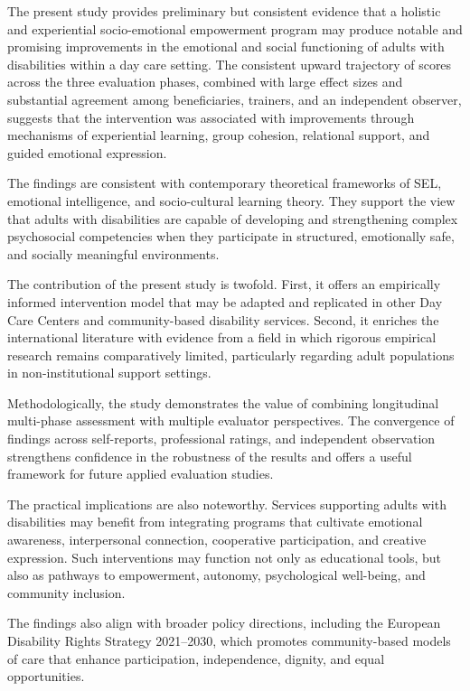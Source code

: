 \documentclass[12pt,a4paper]{article}
\begin{document}
The present study provides preliminary but consistent evidence that a holistic and experiential socio-emotional empowerment program may produce notable and promising improvements in the emotional and social functioning of adults with disabilities within a day care setting. The consistent upward trajectory of scores across the three evaluation phases, combined with large effect sizes and substantial agreement among beneficiaries, trainers, and an independent observer, suggests that the intervention was associated with improvements through mechanisms of experiential learning, group cohesion, relational support, and guided emotional expression.

The findings are consistent with contemporary theoretical frameworks of SEL, emotional intelligence, and socio-cultural learning theory. They support the view that adults with disabilities are capable of developing and strengthening complex psychosocial competencies when they participate in structured, emotionally safe, and socially meaningful environments.

The contribution of the present study is twofold. First, it offers an empirically informed intervention model that may be adapted and replicated in other Day Care Centers and community-based disability services. Second, it enriches the international literature with evidence from a field in which rigorous empirical research remains comparatively limited, particularly regarding adult populations in non-institutional support settings.

Methodologically, the study demonstrates the value of combining longitudinal multi-phase assessment with multiple evaluator perspectives. The convergence of findings across self-reports, professional ratings, and independent observation strengthens confidence in the robustness of the results and offers a useful framework for future applied evaluation studies.

The practical implications are also noteworthy. Services supporting adults with disabilities may benefit from integrating programs that cultivate emotional awareness, interpersonal connection, cooperative participation, and creative expression. Such interventions may function not only as educational tools, but also as pathways to empowerment, autonomy, psychological well-being, and community inclusion.

The findings also align with broader policy directions, including the European Disability Rights Strategy 2021--2030, which promotes community-based models of care that enhance participation, independence, dignity, and equal opportunities.
\end{document}
